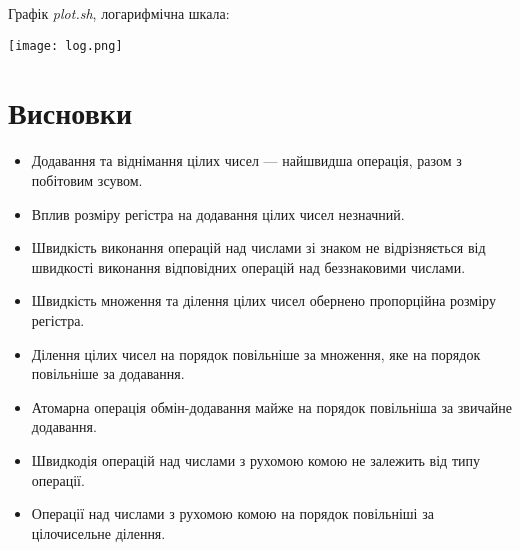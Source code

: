 \documentclass[a4paper]{article}
\begin{document}
Графік \emph{plot.sh}, логарифмічна шкала:

\begin{center}
  \texttt{[image: log.png]}
\end{center}

\section{Висновки}

\begin{itemize}
  \item Додавання та віднімання цілих чисел — найшвидша операція, разом з побітовим зсувом.
  \item Вплив розміру регістра на додавання цілих чисел незначний.
  \item Швидкість виконання операцій над числами зі знаком не відрізняється від швидкості
    виконання відповідних операцій над беззнаковими числами.
  \item Швидкість множення та ділення цілих чисел обернено пропорційна розміру регістра.
  \item Ділення цілих чисел на порядок повільніше за множення, яке на порядок повільніше
    за додавання.
  \item Атомарна операція обмін-додавання майже на порядок повільніша за звичайне додавання.
  \item Швидкодія операцій над числами з рухомою комою не залежить від типу операції.
  \item Операції над числами з рухомою комою на порядок повільніші за цілочисельне ділення.
\end{itemize}
\end{document}
